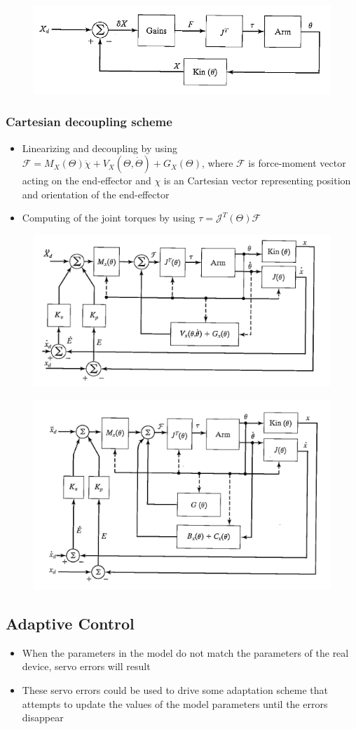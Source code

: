 \documentclass[10pt,a4paper]{article}
\begin{document}
\begin{figure}[H]
	\includegraphics[width=0.5\columnwidth]{imgs/control_cartesian_transpose-jacobian.png}
\end{figure}

\subsubsection{Cartesian decoupling scheme}
\begin{itemize}
	\item Linearizing and decoupling by using $\mathcal{F} = M_X(\Theta)\ddot \chi + V_X(\Theta, \dot \Theta) + G_X(\Theta)$, where $\mathcal{F}$ is force-moment vector acting on the end-effector and $\chi$ is an Cartesian vector representing position and orientation of the end-effector
	\item Computing of the joint torques by using $\tau = \mathcal{J}^T(\Theta) \mathcal{F}$
\end{itemize}

\begin{figure}[H]
	\includegraphics[width=0.5\columnwidth]{imgs/control_model-based_cartesian1.png}
\end{figure}

\begin{figure}[H]
	\includegraphics[width=0.5\columnwidth]{imgs/control_model-based_cartesian2.png}
\end{figure}

\subsection{Adaptive Control}
\begin{itemize}
	\item When the parameters in the model do not match the parameters of the real device, servo errors will result
	\item These servo errors could be used to drive some adaptation scheme that attempts to update the values of the model parameters until the errors disappear
\end{itemize}
\end{document}
